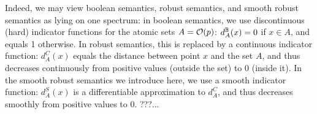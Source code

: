 Indeed, we may view boolean semantics, robust semantics, and smooth robust semantics as lying on one spectrum: 
in boolean semantics, we use discontinuous (hard) indicator functions for the atomic sets $A = \mathcal{O}(p)$: $d^{\mathbb{B}}_A(x) = 0$ if $x \in A$, and equals 1 otherwise.
In robust semantics, this is replaced by a continuous indicator function: $d_A^C(x)$ equals the distance between point $x$ and the set $A$, and thus decreases continuously from positive values (outside the set) to 0 (inside it).
In the smooth robust semantics we introduce here, we use a smooth indicator function: $d_A^S(x)$ is a differentiable approximation to $d_A^C$, and thus decreases smoothly from positive values to 0.
???...
%
%

